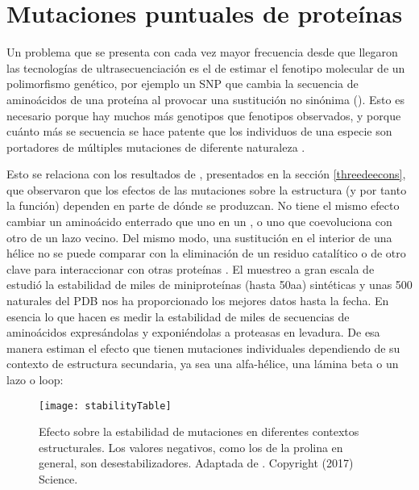 

\section{Mutaciones puntuales de prote\'{i}nas} \label{pointmut}

Un problema que se presenta con cada vez mayor frecuencia desde que llegaron las tecnolog\'{i}as de 
ultrasecuenciaci\'{o}n es el de estimar el fenotipo molecular de un polimorfismo gen\'{e}tico, 
por ejemplo un SNP que cambia la secuencia de amino\'{a}cidos de una prote\'{i}na al provocar 
una sustituci\'{o}n no sin\'{o}nima (). 
Esto es necesario porque hay muchos m\'{a}s genotipos que fenotipos observados, y porque cu\'{a}nto m\'{a}s se secuencia se hace
patente que los individuos de una especie son portadores de m\'{u}ltiples mutaciones de diferente naturaleza
\citep{Peterson2013}.

Esto se relaciona con los resultados de \citet{Chothia1986}, presentados en la secci\'{o}n \ref{threedeecons}, que 
observaron que los efectos de las mutaciones sobre la estructura (y por tanto la funci\'{o}n) dependen en
parte de d\'{o}nde se produzcan. No tiene el mismo efecto cambiar un amino\'{a}cido enterrado que uno en un
, o uno que coevoluciona con otro de un lazo vecino. Del mismo modo, una sustituci\'{o}n en el interior
de una h\'{e}lice no se puede comparar con la eliminaci\'{o}n de un residuo catal\'{i}tico \citep{Berrondo2011}
o de otro clave para interaccionar con otras prote\'{i}nas \citep{deJuan2013}. 
El muestreo a gran escala de \citet{Rocklin2017} estudi\'{o} la estabilidad de miles de miniprote\'{i}nas (hasta 50aa) sint\'{e}ticas 
y unas 500 naturales del PDB nos ha proporcionado los mejores datos hasta la fecha. En esencia lo que hacen es medir la estabilidad 
de miles de secuencias de amino\'{a}cidos expres\'{a}ndolas y exponi\'{e}ndolas a proteasas en levadura.
De esa manera estiman el efecto que tienen mutaciones individuales dependiendo de su contexto de estructura secundaria, 
ya sea una alfa-h\'{e}lice, una l\'{a}mina beta o un lazo o loop:

\begin{figure}
\begin{center} 
\texttt{[image: stabilityTable]}
\caption%
{
Efecto sobre la estabilidad de mutaciones en diferentes contextos estructurales. 
Los valores negativos, como los de la prolina en general, son desestabilizadores. 
Adaptada de \citet{Rocklin2017}. Copyright (2017) Science.
}
\label{fig:miniprotstab} %
\end{center}
\end{figure}

